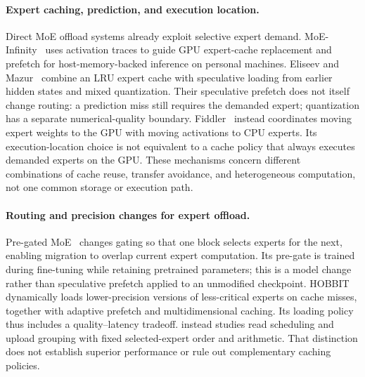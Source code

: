 \paragraph{Expert caching, prediction, and execution location.}
Direct MoE offload systems already exploit selective expert demand.
MoE-Infinity~\cite{xue2024moeinfinity} uses activation traces to guide GPU
expert-cache replacement and prefetch for host-memory-backed inference on
personal machines. Eliseev and Mazur~\cite{eliseev2023fastmoeoffloading}
combine an LRU expert cache with speculative loading from earlier hidden
states and mixed quantization. Their speculative prefetch does not itself
change routing: a prediction miss still requires the demanded expert;
quantization has a separate numerical-quality boundary.
Fiddler~\cite{kamahori2025fiddler} instead coordinates moving expert weights
to the GPU with moving activations to CPU experts. Its execution-location
choice is not equivalent to a cache policy that always executes demanded
experts on the GPU. These mechanisms concern different combinations of cache
reuse, transfer avoidance, and heterogeneous computation, not one common
storage or execution path.

\paragraph{Routing and precision changes for expert offload.}
Pre-gated MoE~\cite{hwang2024pregatedmoe} changes gating so that one block
selects experts for the next, enabling migration to overlap current expert
computation. Its pre-gate is trained during fine-tuning while retaining
pretrained parameters; this is a model change rather than speculative
prefetch applied to an unmodified checkpoint.
HOBBIT~\cite{tang2024hobbit} dynamically loads lower-precision versions of
less-critical experts on cache misses, together with adaptive prefetch and
multidimensional caching. Its loading policy thus includes a quality--latency
tradeoff. \system{} instead studies read scheduling and upload grouping with
fixed selected-expert order and arithmetic. That distinction does not establish
superior performance or rule out complementary caching policies.

